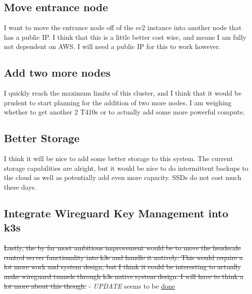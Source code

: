 \documentclass[12pt]{article}
\begin{document}
\subsection{Move entrance node}
I want to move the entrance node off of the ec2 instance into another node that has a public IP. I think that this is a little better cost wise, and means I am fully not dependent on AWS. I will need a public IP for this to work however.

\subsection{Add two more nodes}
I quickly reach the maximum limits of this cluster, and I think that it would be prudent to start planning for the addition of two more nodes. I am weighing whether to get another 2 T410s or to actually add some more powerful compute.

\subsection{Better Storage}
I think it will be nice to add some better storage to this system. The current storage capabilities are alright, but it would be nice to do intermittent backups to the cloud as well as potentially add even more capacity. SSDs do not cost much these days.

\subsection{Integrate Wireguard Key Management into k3s}
\sout{Lastly, the by far most ambitious improvement would be to move the headscale control server functionality into k3s and handle it natively. This would require a lot more work and system design, but I think it could be interesting to actually make wireguard tunnels through k3s native system design. I will have to think a lot more about this though.} - \emph{UPDATE} seems to be \href{https://www.netmaker.org/blog/deploy-distributed-kubernetes-clusters-with-wireguard-and-netmaker}{done}
\end{document}

